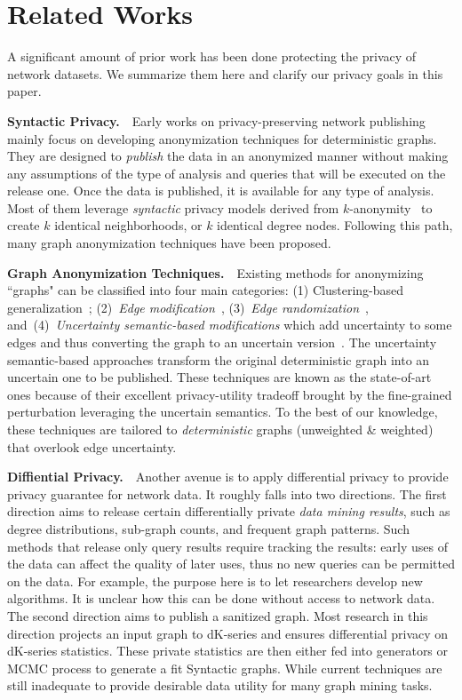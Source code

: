\section{Related Works}
A significant amount of prior work has been done protecting the privacy of network datasets.
We summarize them here and clarify our privacy goals in this paper. 

\textbf{Syntactic Privacy.}~~Early works on privacy-preserving network publishing mainly focus on developing anonymization techniques for deterministic graphs. They are designed to \emph{publish} the data in an anonymized manner without making any assumptions of the type of analysis and queries that will be executed on the release one. Once the data is published, it is available for any type of analysis. Most of them leverage \emph{syntactic} privacy models derived from $k$-anonymity~\cite{Sweeney:2002:KAM:774544.774552} to create $k$ identical neighborhoods, or $k$ identical degree nodes. Following this path, many graph anonymization techniques have been proposed.

\textbf{Graph Anonymization Techniques.}~~Existing methods for anonymizing ``graphs" can be classified into four main categories: (1) Clustering-based generalization~\cite{Hay_Anonymizing_2007,Bhagat_Class_2009,hay2010resisting}; (2)~{\em Edge modification}~\cite{Liu_Towards_2008, Zhou_Preserving_2008, Wang2011, Wu_k_2010, Skarkala_Privacy_2012}, 
(3)~{\em Edge randomization}~\cite{Liu_Privacy_2009,Ying_Randomizing_2008, Ninggal_Utility_2015},
and~(4)~{\em Uncertainty semantic-based modifications} which add uncertainty to some edges and thus converting the graph to an uncertain version~\cite{Boldi_Injecting_2012, Nguyen_Anonymizing_2015}. The uncertainty semantic-based approaches transform the original deterministic graph into an uncertain one to be published. These techniques are known as the state-of-art ones because of their excellent privacy-utility tradeoff brought by the fine-grained perturbation leveraging the uncertain semantics. To the best of our knowledge, these techniques are tailored to \emph{deterministic} graphs (unweighted \& weighted) that overlook edge uncertainty.  

\textbf{Diffiential Privacy.}~~Another avenue is to apply differential privacy to provide privacy guarantee for network data. It roughly falls into two directions. The first direction aims to release certain differentially private \emph{data mining results}, such as degree distributions, sub-graph counts, and frequent graph patterns. Such methods that release only query results require tracking the results: early uses of the data can affect the quality of later uses, thus no new queries can be permitted on the data. For example, the purpose here is to let researchers develop new algorithms. It is unclear how this can be done without access to network data. The second direction aims to publish a sanitized graph. Most research in this direction projects an input graph to dK-series and ensures differential privacy on dK-series statistics. These private statistics are then either fed into generators or MCMC process to generate a fit Syntactic graphs. While current techniques are still inadequate to provide desirable data utility for many graph mining tasks. 

